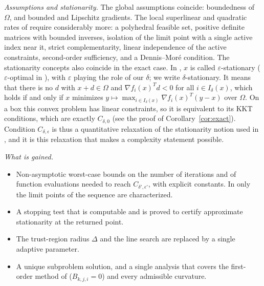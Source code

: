\documentclass[11pt]{article}
\begin{document}
\emph{Assumptions and stationarity.} The global assumptions coincide:
boundedness of $\Omega$, and bounded and Lipschitz gradients. The local
superlinear and quadratic rates of \cite{yano1} require considerably more: a
polyhedral feasible set, positive definite matrices with bounded inverses,
isolation of the limit point with a single active index near it, strict
complementarity, linear independence of the active constraints, second-order
sufficiency, and a Dennis--Mor\'e condition. The stationarity
concepts also coincide in the exact case. In \cite{yano1}, $x$ is
called $\varepsilon$-stationary ($\varepsilon$-optimal in \cite{dunder1}), with
$\varepsilon$ playing the role of our $\delta$; we write $\delta$-stationary. It
means that there is no $d$ with $x + d \in \Omega$ and
$\nabla f_i(x)^T d < 0$ for all $i \in I_\delta(x)$, which holds if and only if
$x$ minimizes $y \mapsto \max_{i \in I_\delta(x)} \nabla f_i(x)^T(y - x)$ over
$\Omega$. On a box this convex problem has linear constraints, so it is
equivalent to its KKT conditions, which are exactly $C_{\delta,0}$ (see the proof
of Corollary~\ref{cor:exact}). Condition $C_{\delta,\epsilon}$ is thus a
quantitative relaxation of the stationarity notion used in \cite{yano1}, and it
is this relaxation that makes a complexity statement possible.

\emph{What is gained.}
\begin{itemize}
\item Non-asymptotic worst-case bounds on the number of iterations and of
function evaluations needed to reach $C_{\delta',\epsilon'}$, with explicit
constants. In \cite{yano1} only the limit points of the sequence are
characterized.
\item A stopping test that is computable and is proved to certify approximate
stationarity at the returned point.
\item The trust-region radius $\Delta$ and the line search are replaced by a
single adaptive parameter.
\item A unique subproblem solution, and a single analysis that covers the
first-order method of \cite{alvarezovo} ($B_{k,j,i} = 0$) and every admissible
curvature.
\end{itemize}
\end{document}
